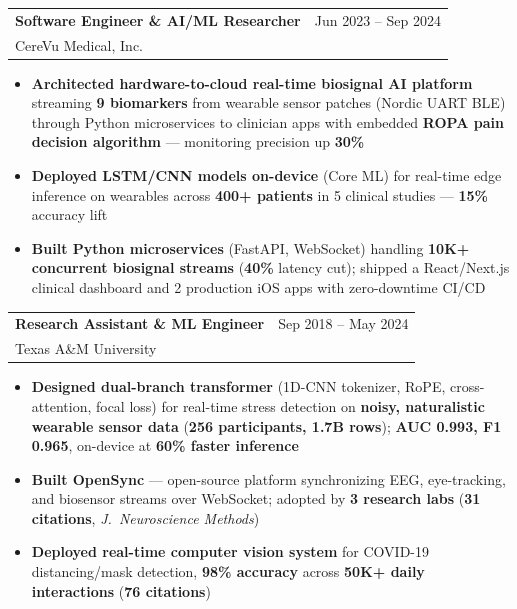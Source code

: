 \documentclass[10.5pt,letterpaper]{article}
\makeatletter
\newcommand{\cventry}[5]{%
  \noindent\begin{tabularx}{\textwidth}{@{}X r@{}}
    {\bfseries\color{headerblue}#2} & {\color{graytext}#1} \\
    {\color{accentcolor}#3}\enskip{\color{lightgray}#4} & \\
  \end{tabularx}%
  \vspace{0.02em}%
  #5%
  \vspace{0.12em}%
}
\makeatother
\begin{document}
\cventry{Jun 2023 -- Sep 2024}{Software Engineer \& AI/ML Researcher}{CereVu Medical, Inc.}{San Francisco Bay Area, CA}{
\begin{itemize}[leftmargin=0.4cm, itemsep=0.02cm, topsep=0.04cm, label={\color{goldaccent}\textbullet}]
  \item \textbf{Architected hardware-to-cloud real-time biosignal AI platform} streaming \textbf{9 biomarkers} from wearable sensor patches (Nordic UART BLE) through Python microservices to clinician apps with embedded \textbf{ROPA pain decision algorithm} --- monitoring precision up \textbf{30\%}
  \item \textbf{Deployed LSTM/CNN models on-device} (Core ML) for real-time edge inference on wearables across \textbf{400+ patients} in 5 clinical studies --- \textbf{15\%} accuracy lift
  \item \textbf{Built Python microservices} (FastAPI, WebSocket) handling \textbf{10K+ concurrent biosignal streams} (\textbf{40\%} latency cut); shipped a React/Next.js clinical dashboard and 2 production iOS apps with zero-downtime CI/CD
\end{itemize}
}

\cventry{Sep 2018 -- May 2024}{Research Assistant \& ML Engineer}{Texas A\&M University}{College Station, TX}{
\begin{itemize}[leftmargin=0.4cm, itemsep=0.02cm, topsep=0.04cm, label={\color{goldaccent}\textbullet}]
  \item \textbf{Designed dual-branch transformer} (1D-CNN tokenizer, RoPE, cross-attention, focal loss) for real-time stress detection on \textbf{noisy, naturalistic wearable sensor data} (\textbf{256 participants, 1.7B rows}); \textbf{AUC 0.993, F1 0.965}, on-device at \textbf{60\% faster inference}
  \item \textbf{Built OpenSync} --- open-source platform synchronizing EEG, eye-tracking, and biosensor streams over WebSocket; adopted by \textbf{3 research labs} (\textbf{31 citations}, \textit{J.\ Neuroscience Methods})
  \item \textbf{Deployed real-time computer vision system} for COVID-19 distancing/mask detection, \textbf{98\% accuracy} across \textbf{50K+ daily interactions} (\textbf{76 citations})
\end{itemize}
}
\end{document}
